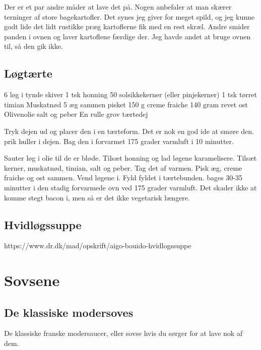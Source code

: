\documentclass[
  letterpaper,
  DIV=11,
  numbers=noendperiod]{scrreprt}
\begin{document}
Der er et par andre måder at lave det på. Nogen anbefaler at man skærer
terninger af store bagekartofler. Det synes jeg giver for meget spild,
og jeg kunne godt lide det lidt rustikke præg kartoflerne fik med en
rest skræl. Andre smider panden i ovnen og laver kartoflene færdige der.
Jeg havde andet at bruge ovnen til, så den gik ikke.

\hypertarget{luxf8gtuxe6rte}{%
\section{Løgtærte}\label{luxf8gtuxe6rte}}

6 løg i tynde skiver 1 tsk honning 50 solsikkekerner (eller pinjekerner)
1 tsk tørret timian Muskatnød 5 æg sammen pisket 150 g creme fraiche 140
gram revet ost Olivenolie salt og peber En rulle grov tærtedej

Tryk dejen ud og placer den i en tærteform. Det er nok en god ide at
smøre den. prik huller i dejen. Bag den i forvarmet 175 grader varmluft
i 10 minutter.

Sauter løg i olie til de er bløde. Tilsæt honning og lad løgene
karamelisere. Tilsæt kerner, muskatnød, timian, salt og peber. Tag det
af varmen. Pisk æg, creme fraiche og ost sammen. Vend løgene i. Fyld
fyldet i tærtebunden. bages 30-35 minutter i den stadig forvarmede ovn
ved 175 grader varmluft. Det skader ikke at komme stegt bacon i, men så
er det ikke vegetarisk længere.

\hypertarget{hvidluxf8gssuppe}{%
\section{Hvidløgssuppe}\label{hvidluxf8gssuppe}}

https://www.dr.dk/mad/opskrift/aigo-bouido-hvidlogssuppe


\hypertarget{sovsene}{%
\chapter{Sovsene}\label{sovsene}}

\hypertarget{de-klassiske-modersoves}{%
\section{De klassiske modersoves}\label{de-klassiske-modersoves}}

De klassiske franske modersaucer, eller sovse hvis du sørger for at lave
nok af dem.
\end{document}
